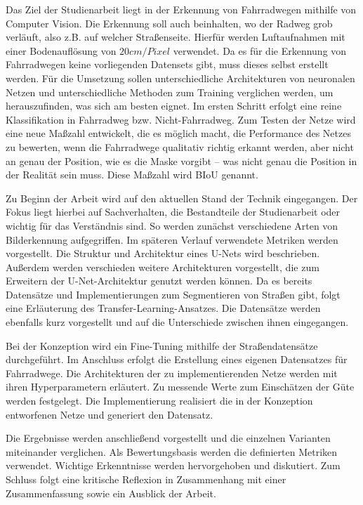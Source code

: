 Das Ziel der Studienarbeit liegt in der Erkennung von Fahrradwegen mithilfe von Computer Vision.
Die Erkennung soll auch beinhalten, wo der Radweg grob verläuft, also z.B. auf welcher Straßenseite.
Hierfür werden Luftaufnahmen mit einer Bodenauflösung von $20 cm/Pixel$ verwendet.
Da es für die Erkennung von Fahrradwegen keine vorliegenden Datensets gibt, muss dieses selbst erstellt werden.
Für die Umsetzung sollen unterschiedliche Architekturen von neuronalen Netzen und unterschiedliche Methoden 
zum Training verglichen werden, um herauszufinden, was sich am besten eignet. 
Im ersten Schritt erfolgt eine reine Klassifikation in Fahrradweg bzw. Nicht-Fahrradweg.
Zum Testen der Netze wird eine neue Maßzahl entwickelt, die es möglich macht, 
die Performance des Netzes zu bewerten, wenn die Fahrradwege qualitativ richtig 
erkannt werden, aber nicht an genau der Position, wie es die Maske vorgibt -- 
was nicht genau die Position in der Realität sein muss.
Diese Maßzahl wird \ac{BIoU} genannt.


Zu Beginn der Arbeit wird auf den aktuellen Stand der Technik eingegangen.
Der Fokus liegt hierbei auf Sachverhalten, die Bestandteile der Studienarbeit oder wichtig für das Verständnis sind.
So werden zunächst verschiedene Arten von Bilderkennung aufgegriffen.
Im späteren Verlauf verwendete Metriken werden vorgestellt.
Die Struktur und Architektur eines U-Nets wird beschrieben. Außerdem werden verschieden weitere Architekturen 
vorgestellt, die zum Erweitern der U-Net-Architektur genutzt werden können.
Da es bereits Datensätze und Implementierungen zum Segmentieren von Straßen gibt, folgt eine Erläuterung des Transfer-Learning-Ansatzes.
Die Datensätze werden ebenfalls kurz vorgestellt und auf die Unterschiede zwischen ihnen eingegangen.

Bei der Konzeption wird ein Fine-Tuning mithilfe der Straßendatensätze durchgeführt.
Im Anschluss erfolgt die Erstellung eines eigenen Datensatzes für Fahrradwege.
Die Architekturen der zu implementierenden Netze werden mit ihren Hyperparametern erläutert.
Zu messende Werte zum Einschätzen der Güte werden festgelegt.
Die Implementierung realisiert die in der Konzeption entworfenen Netze und generiert den Datensatz.

Die Ergebnisse werden anschließend vorgestellt und die einzelnen Varianten miteinander verglichen.
Als Bewertungsbasis werden die definierten Metriken verwendet.
Wichtige Erkenntnisse werden hervorgehoben und diskutiert. 
Zum Schluss folgt eine kritische Reflexion in Zusammenhang mit einer Zusammenfassung sowie ein Ausblick der Arbeit.